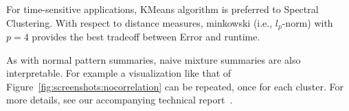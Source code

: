 
For time-sensitive applications, KMeans algorithm is preferred to Spectral Clustering.
With respect to distance measures, minkowski (i.e., $l_p$-norm) with $p=4$ provides the best tradeoff between Error and runtime.

As with normal pattern summaries, naive mixture summaries are also interpretable.
For example a visualization like that of Figure~\ref{fig:screenshots:nocorrelation} can be repeated, once for each cluster.  
For more details, see our accompanying technical report~\cite{DBLP:journals/corr/abs-1809-00405}.


